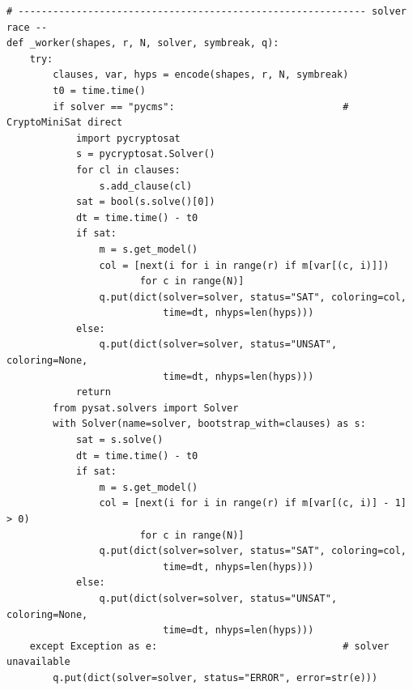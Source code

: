 \documentclass[12pt]{article}
\begin{document}
\begin{lstlisting}[style=plainstyle]
# ------------------------------------------------------------ solver race --
def _worker(shapes, r, N, solver, symbreak, q):
    try:
        clauses, var, hyps = encode(shapes, r, N, symbreak)
        t0 = time.time()
        if solver == "pycms":                             # CryptoMiniSat direct
            import pycryptosat
            s = pycryptosat.Solver()
            for cl in clauses:
                s.add_clause(cl)
            sat = bool(s.solve()[0])
            dt = time.time() - t0
            if sat:
                m = s.get_model()
                col = [next(i for i in range(r) if m[var[(c, i)]])
                       for c in range(N)]
                q.put(dict(solver=solver, status="SAT", coloring=col,
                           time=dt, nhyps=len(hyps)))
            else:
                q.put(dict(solver=solver, status="UNSAT", coloring=None,
                           time=dt, nhyps=len(hyps)))
            return
        from pysat.solvers import Solver
        with Solver(name=solver, bootstrap_with=clauses) as s:
            sat = s.solve()
            dt = time.time() - t0
            if sat:
                m = s.get_model()
                col = [next(i for i in range(r) if m[var[(c, i)] - 1] > 0)
                       for c in range(N)]
                q.put(dict(solver=solver, status="SAT", coloring=col,
                           time=dt, nhyps=len(hyps)))
            else:
                q.put(dict(solver=solver, status="UNSAT", coloring=None,
                           time=dt, nhyps=len(hyps)))
    except Exception as e:                                # solver unavailable
        q.put(dict(solver=solver, status="ERROR", error=str(e)))


\end{lstlisting}
\end{document}
